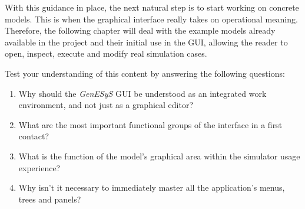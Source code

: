 With this guidance in place, the next natural step is to start working on concrete models. This is when the graphical interface really takes on operational meaning. Therefore, the following chapter will deal with the example models already available in the project and their initial use in the GUI, allowing the reader to open, inspect, execute and modify real simulation cases.

Test your understanding of this content by answering the following questions:

\begin{enumerate}
\item Why should the \textit{GenESyS} GUI be understood as an integrated work environment, and not just as a graphical editor?

\item What are the most important functional groups of the interface in a first contact?

\item What is the function of the model's graphical area within the simulator usage experience?

\item Why isn't it necessary to immediately master all the application's menus, trees and panels?
\end{enumerate}
